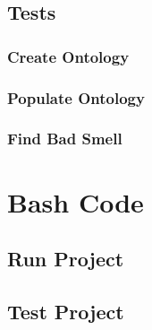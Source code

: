 \documentclass [14 pt]{article}
\begin{document}
\subsection{Tests}
\subsubsection{Create Ontology}

\subsubsection{Populate Ontology}

\subsubsection{Find Bad Smell}




\section{Bash Code} 
\subsection{Run Project}

\subsection{Test Project}

\end{document}

